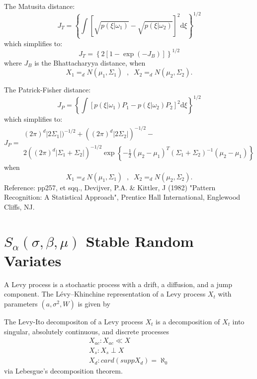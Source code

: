 The Matusita distance:
\[J_T  = \left\{ {\int {\left[ {\sqrt {p(\xi \left| {\omega _1 }
\right.)}  - \sqrt {p(\xi \left| {\omega _2 } \right.)} } \right]}
^2 {\text{d}}\xi } \right\}^{{1 / 2}} \] which simplifies to: \[
J_T = \left\{ {2\left[ {1 - \exp ( - J_B )} \right]}
\right\}^{{1/2 }} \] where $J_B$ is the Bhattacharyya distance,
when \[X_1 =_d  N(\mu_1,\Sigma_1) \;\; , \;\; X_2 =_d
N(\mu_2,\Sigma_2).\]

The Patrick-Fisher distance:
\[J_P  = \left\{ {\int {\left[ {p(\xi \left| {\omega _1 }
\right.)P_1  - p(\xi \left| {\omega _2 } \right.)P_2 } \right]} ^2
{\text{d}}\xi } \right\}^{{1/2}}\] which simplifies to:\[J_P =
\begin{array}{cc} {(2\pi )^d \left| {2\Sigma _1 } \right|} )^{ -
{1/2}} + ( {(2\pi )^d \left| {2\Sigma _2 } \right|} )^{ - {1/2}} -
\\ 2( {(2\pi )^d \left| {\Sigma _1  + \Sigma _2 } \right|}
)^{-{1/2}} \exp \left\{ { - \tfrac{1} {2}(\mu _2  - \mu _1
)^T(\Sigma _1  + \Sigma _2 )^{ - 1} (\mu _2  - \mu _1 )}
\right\}\end{array}\] when \[X_1 =_d N(\mu_1,\Sigma_1) \;\;  ,
\;\; X_2 =_d N(\mu_2,\Sigma_2).\]
 Reference: pp257, et sqq., Devijver, P.A.
\& Kittler, J (1982) "Pattern Recognition: A Statistical
Approach", Prentice Hall International, Englewood Cliffs, NJ.

\section*{$S_\alpha(\sigma,\beta,\mu)$ Stable Random Variates}

A Levy process is a stochastic process with a drift, a diffusion, and a jump component.
The Lévy–Khinchine representation of a Levy process $X_t$ with parameters $(a,\sigma^2,W)$
is given by

The Levy-Ito decompositon of a Levy process $X_t$ is a decomposition of $X_t$ into
singular, absolutely continuous, and discrete processes
\begin{eqnarray*}
 X_{ac} : X_{ac} \ll X \\
 X_s : X_s \perp X \\
 X_d : card (supp X_d) = \aleph_0
\end{eqnarray*}
via Lebesgue's decomposition theorem.



